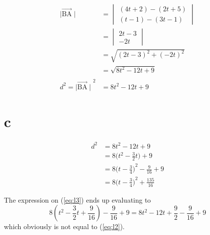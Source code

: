 \documentclass{article}
\begin{document}
\begin{align*}
	\mid\vec{\mathrm{BA}}\mid          & =
	\begin {vmatrix}
	(4t + 2) - (2t + 5)                                     \\
	( t - 1) - (3t - 1)
	\end {vmatrix}                                          \\
	                                   & =
	\begin {vmatrix}
	2t - 3                                                  \\
	-2t
	\end {vmatrix}                                          \\
	                                   & =
	\sqrt {(2t - 3)^2 + (-2t)^2}                            \\
	                                   & =
	\sqrt {8t^2 -12t + 9}                                   \\
	\\
	d^2 ={\mid\vec{\mathrm{BA}}\mid}^2 & = 8 t^2 - 12 t + 9
\end{align*}

\section{c}

\begin{align}
	d^2 & = 8 t^2 - 12 t + 9                       \label{eq:l1}         \\
	    & = 8\Big(t^2 - \frac 32 t\Big) + 9                \label{eq:l2} \\
	    & = 8{\Big(t - \frac 34\Big)}^2 - \frac 9 {16} + 9 \label{eq:l3} \\
	    & = 8{\Big(t - \frac 34\Big)}^2 + \frac {135} {16} \label{eq:l4}
\end{align}

The expression on (\ref{eq:l3}) ends up evaluating to
$$8(t^2 - \frac 32 t + \frac 9 {16}) - \frac 9{16} + 9 = 8t^2 - 12 t + \frac 9 {2} - \frac 9{16} + 9$$
which obviously is not equal to (\ref{eq:l2}).
\end{document}
